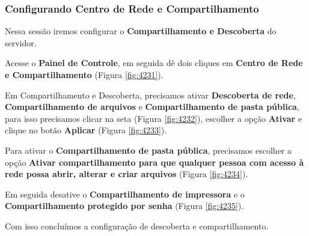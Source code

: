 \documentclass[10pt]{article}
\begin{document}
\subsubsection{Configurando Centro de Rede e Compartilhamento}
\par Nessa sessão iremos configurar o \textbf{Compartilhamento e Descoberta} do servidor.
\par Acesse o \textbf{Painel de Controle}, em seguida dê dois cliques em \textbf{Centro de Rede e Compartilhamento} (Figura \ref{fig:4231}).
\par Em Compartilhamento e Descoberta, precisamos ativar \textbf{Descoberta de rede}, \textbf{Compartilhamento de arquivos} e \textbf{Compartilhamento de pasta pública}, para isso precisamos clicar na seta (Figura \ref{fig:4232}), escolher a opção \textbf{Ativar} e clique no botão \textbf{Aplicar} (Figura \ref{fig:4233}). 
\par Para ativar o \textbf{Compartilhamento de pasta pública}, precisamos escolher a opção \textbf{Ativar compartilhamento para que qualquer pessoa com acesso à rede possa abrir, alterar e criar arquivos} (Figura \ref{fig:4234}).
\par Em seguida desative o \textbf{Compartilhamento de impressora} e o \textbf{Compartilhamento protegido por senha} (Figura \ref{fig:4235}).
\par Com isso concluímos a configuração de descoberta e compartilhamento.
\end{document}
